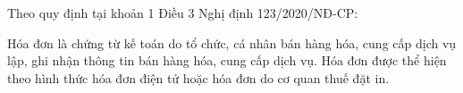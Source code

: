
  Theo quy định tại khoản 1 Điều 3 Nghị định 123/2020/NĐ-CP:

Hóa đơn là chứng từ kế toán do tổ chức, cá nhân bán hàng hóa, cung cấp dịch vụ lập, ghi nhận thông tin bán hàng hóa, cung cấp dịch vụ. Hóa đơn được thể hiện theo hình thức hóa đơn điện tử hoặc hóa đơn do cơ quan thuế đặt in.